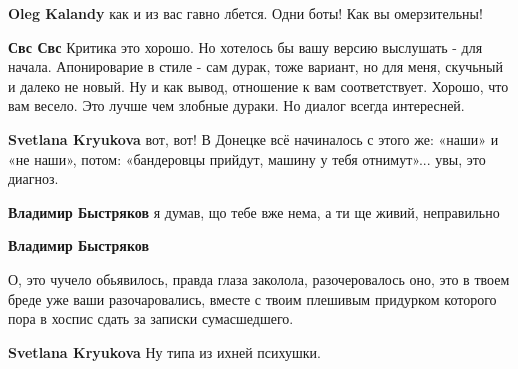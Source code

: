 \begin{itemize}
\begin{itemize}
\textbf{Oleg Kalandy} как и из вас гавно лбется. Одни боты! Как вы омерзительны!

 
\textbf{Свс Свс} Критика это хорошо. Но хотелось бы вашу версию выслушать - для
начала. Апонироварие в стиле - сам дурак, тоже вариант, но для меня, скучьный и
далеко не новый. Ну и как вывод, отношение к вам соответствует. Хорошо, что вам
весело. Это лучше чем злобные дураки. Но диалог всегда интересней.

 
\textbf{Svetlana Kryukova} вот, вот! В Донецке всё начиналось с этого же: «наши» и «не наши», потом: «бандеровцы прийдут, машину у тебя отнимут»... увы, это диагноз.

 
\textbf{Владимир Быстряков} я думав, що тебе вже нема, а ти ще живий, неправильно

 
\textbf{Владимир Быстряков} 

О, это чучело обьявилось, правда глаза заколола, разочеровалось оно, это в твоем
бреде уже ваши разочаровались, вместе с твоим плешивым придурком которого пора в
хоспис сдать за записки сумасшедшего.

 
\textbf{Svetlana Kryukova} Ну типа из ихней психушки.

 

\end{itemize}
\end{itemize}
